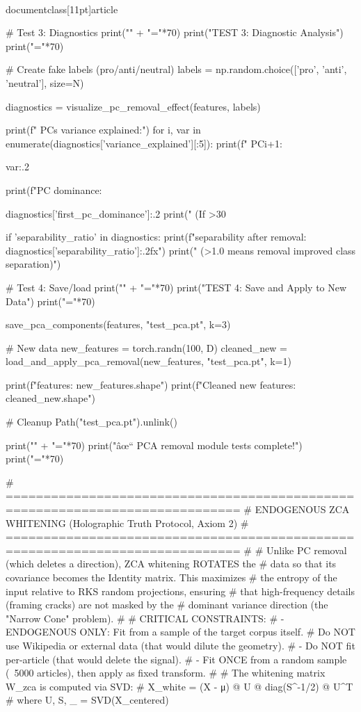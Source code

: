 \\documentclass[11pt]{article}
\begin{document}
\begin{CodeBlock}
{{{    # Test 3: Diagnostics
    print("\n" + "="*70)
    print("TEST 3: Diagnostic Analysis")
    print("="*70)
    
    # Create fake labels (pro/anti/neutral)
    labels = np.random.choice(['pro', 'anti', 'neutral'], size=N)
    
    diagnostics = visualize_pc_removal_effect(features, labels)
    
    print(f" PCs variance explained:")
    for i, var in enumerate(diagnostics['variance_explained'][:5]):
        print(f"  PC{i+1}: {var:.2%
    
    print(f"\nFirst PC dominance: {diagnostics['first_pc_dominance']:.2%
    print("  (If >30%
    
    if 'separability_ratio' in diagnostics:
        print(f"\nClass separability after removal: {diagnostics['separability_ratio']:.2f}x")
        print("  (>1.0 means removal improved class separation)")
    
    # Test 4: Save/load
    print("\n" + "="*70)
    print("TEST 4: Save and Apply to New Data")
    print("="*70)
    
    save_pca_components(features, "test_pca.pt", k=3)
    
    # New data
    new_features = torch.randn(100, D)
    cleaned_new = load_and_apply_pca_removal(new_features, "test_pca.pt", k=1)
    
    print(f"\nNew features: {new_features.shape}")
    print(f"Cleaned new features: {cleaned_new.shape}")
    
    # Cleanup
    Path("test_pca.pt").unlink()
    
    print("\n" + "="*70)
    print("âœ“ PCA removal module tests complete!")
    print("="*70)

# =============================================================================
# ENDOGENOUS ZCA WHITENING (Holographic Truth Protocol, Axiom 2)
# =============================================================================
#
# Unlike PC removal (which deletes a direction), ZCA whitening ROTATES the
# data so that its covariance becomes the Identity matrix. This maximizes
# the entropy of the input relative to RKS random projections, ensuring
# that high-frequency details (framing cracks) are not masked by the
# dominant variance direction (the "Narrow Cone" problem).
#
# CRITICAL CONSTRAINTS:
# - ENDOGENOUS ONLY: Fit from a sample of the target corpus itself.
#   Do NOT use Wikipedia or external data (that would dilute the geometry).
# - Do NOT fit per-article (that would delete the signal).
# - Fit ONCE from a random sample (~5000 articles), then apply as fixed transform.
#
# The whitening matrix W_zca is computed via SVD:
#   X_white = (X - μ) @ U @ diag(S^{-1/2}) @ U^T
# where U, S, _ = SVD(X_centered)


}}}}}
\end{CodeBlock}
\end{document}
